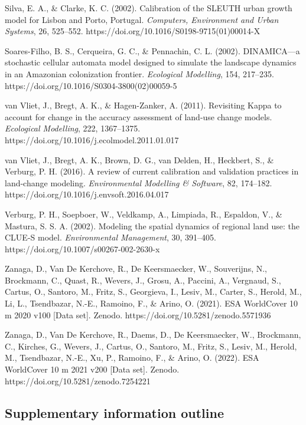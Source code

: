 Silva, E. A., \& Clarke, K. C. (2002). Calibration of the SLEUTH urban
growth model for Lisbon and Porto, Portugal. \emph{Computers,
Environment and Urban Systems}, 26, 525--552.
https://doi.org/10.1016/S0198-9715(01)00014-X

Soares-Filho, B. S., Cerqueira, G. C., \& Pennachin, C. L. (2002).
DINAMICA---a stochastic cellular automata model designed to simulate the
landscape dynamics in an Amazonian colonization frontier.
\emph{Ecological Modelling}, 154, 217--235.
https://doi.org/10.1016/S0304-3800(02)00059-5

van Vliet, J., Bregt, A. K., \& Hagen-Zanker, A. (2011). Revisiting
Kappa to account for change in the accuracy assessment of land-use
change models. \emph{Ecological Modelling}, 222, 1367--1375.
https://doi.org/10.1016/j.ecolmodel.2011.01.017

van Vliet, J., Bregt, A. K., Brown, D. G., van Delden, H., Heckbert, S.,
\& Verburg, P. H. (2016). A review of current calibration and validation
practices in land-change modeling. \emph{Environmental Modelling \&
Software}, 82, 174--182. https://doi.org/10.1016/j.envsoft.2016.04.017

Verburg, P. H., Soepboer, W., Veldkamp, A., Limpiada, R., Espaldon, V.,
\& Mastura, S. S. A. (2002). Modeling the spatial dynamics of regional
land use: the CLUE-S model. \emph{Environmental Management}, 30,
391--405. https://doi.org/10.1007/s00267-002-2630-x

Zanaga, D., Van De Kerchove, R., De Keersmaecker, W., Souverijns, N.,
Brockmann, C., Quast, R., Wevers, J., Grosu, A., Paccini, A., Vergnaud,
S., Cartus, O., Santoro, M., Fritz, S., Georgieva, I., Lesiv, M.,
Carter, S., Herold, M., Li, L., Tsendbazar, N.-E., Ramoino, F., \&
Arino, O. (2021). ESA WorldCover 10 m 2020 v100 {[}Data set{]}. Zenodo.
https://doi.org/10.5281/zenodo.5571936

Zanaga, D., Van De Kerchove, R., Daems, D., De Keersmaecker, W.,
Brockmann, C., Kirches, G., Wevers, J., Cartus, O., Santoro, M., Fritz,
S., Lesiv, M., Herold, M., Tsendbazar, N.-E., Xu, P., Ramoino, F., \&
Arino, O. (2022). ESA WorldCover 10 m 2021 v200 {[}Data set{]}. Zenodo.
https://doi.org/10.5281/zenodo.7254221

\subsection{Supplementary information
outline}\label{supplementary-information-outline}

